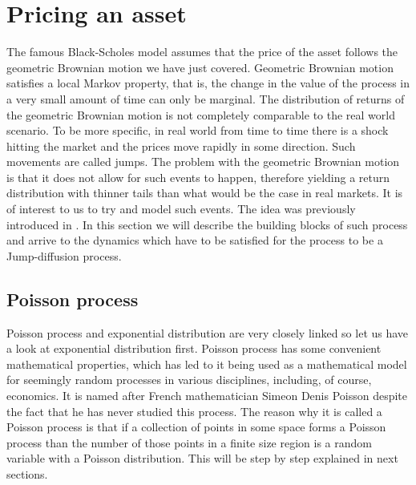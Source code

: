 \documentclass[times, utf8, diplomski]{fer}
\begin{document}
\chapter{Pricing an asset}
The famous Black-Scholes model assumes that the price of the asset follows the geometric Brownian motion we have just covered. Geometric Brownian motion satisfies a local Markov property, that is, the change in the value of the process in a very small amount of time can only be marginal. The distribution of returns of the geometric Brownian motion is not completely comparable to the real world scenario. To be more specific, in real world from time to time there is a shock hitting the market and the prices move rapidly in some direction. Such movements are called jumps. The problem with the geometric Brownian motion is that it does not allow for such events to happen, therefore yielding a return distribution with thinner tails than what would be the case in real markets. It is of interest to us to try and model such events. The idea was previously introduced in \cite{merton_option_1976}. In this section we will describe the building blocks of such process and arrive to the dynamics which have to be satisfied for the process to be a Jump-diffusion process.

	\section{Poisson process}
	Poisson process and exponential distribution are very closely linked so let us have a look at exponential distribution first. Poisson process has some convenient mathematical properties, which has led to it being used as a mathematical model for seemingly random processes in various disciplines, including, of course, economics. It is named after French mathematician Simeon Denis Poisson despite the fact that he has never studied this process. The reason why it is called a Poisson process is that if a collection of points in some space forms a Poisson process than the number of those points in a finite size region is a random variable with a Poisson distribution. This will be step by step explained in next sections.
\end{document}
